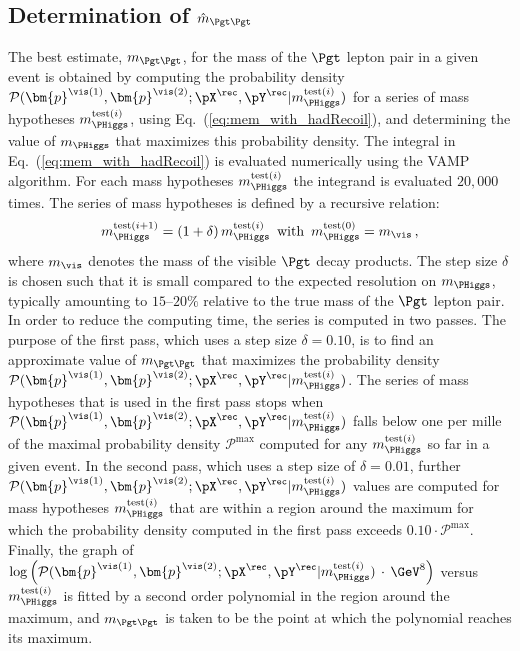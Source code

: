 \subsection{Determination of $\hat{m}_{\Pgt\Pgt}$}
\label{sec:mem_numericalMaximization}

The best estimate, $m_{\Pgt\Pgt}$, for the mass of the $\Pgt$ lepton pair in a given event
is obtained by computing the probability density $\mathcal{P}(\bm{p}^{\vis(1)},\bm{p}^{\vis(2)};\pX^{\rec},\pY^{\rec}|m_{\PHiggs}^{\textrm{test}(i)})$ 
for a series of mass hypotheses $m_{\PHiggs}^{\textrm{test}(i)}$, using Eq.~(\ref{eq:mem_with_hadRecoil}), and determining the value of $m_{\PHiggs}$ that maximizes this probability density.
The integral in Eq.~(\ref{eq:mem_with_hadRecoil}) is evaluated numerically using the VAMP algorithm.
For each mass hypotheses $m_{\PHiggs}^{\textrm{test}(i)}$ the integrand is evaluated $20,000$ times.
The series of mass hypotheses is defined by a recursive relation: 
\begin{equation}
m_{\PHiggs}^{\textrm{test}(i + 1)} = (1 + \delta) \,  m_{\PHiggs}^{\textrm{test}(i)} \, \mbox{ with } \, m_{\PHiggs}^{\textrm{test}(0)} = m_{\vis} \, ,
\label{eq:mTauTau_step_size}
\end{equation}
where $m_{\vis}$ denotes the mass of the visible $\Pgt$ decay products.
The step size $\delta$ is chosen such that it is small compared to the
expected resolution on $m_{\PHiggs}$,
typically amounting to $15$--$20\%$ relative to the true mass of the $\Pgt$ lepton pair.
In order to reduce the computing time, the series is computed in two passes.
The purpose of the first pass, which uses a step size $\delta = 0.10$, is to find an approximate value of $m_{\Pgt\Pgt}$
that maximizes the probability density $\mathcal{P}(\bm{p}^{\vis(1)},\bm{p}^{\vis(2)};\pX^{\rec},\pY^{\rec}|m_{\PHiggs}^{\textrm{test}(i)})$.
The series of mass hypotheses that is used in the first pass stops when $\mathcal{P}(\bm{p}^{\vis(1)},\bm{p}^{\vis(2)};\pX^{\rec},\pY^{\rec}|m_{\PHiggs}^{\textrm{test}(i)})$ falls below one per mille 
of the maximal probability density $\mathcal{P}^{\textrm{max}}$
computed for any $m_{\PHiggs}^{\textrm{test}(i)}$ so far in a given event.
In the second pass, which uses a step size of $\delta = 0.01$,
further $\mathcal{P}(\bm{p}^{\vis(1)},\bm{p}^{\vis(2)};\pX^{\rec},\pY^{\rec}|m_{\PHiggs}^{\textrm{test}(i)})$ values 
are computed for mass hypotheses $m_{\PHiggs}^{\textrm{test}(i)}$ that
are within a region around the maximum
for which the probability density computed in the first pass exceeds
$0.10 \cdot \mathcal{P}^{\textrm{max}}$.
Finally, the graph of $\log \left( \mathcal{P}(\bm{p}^{\vis(1)},\bm{p}^{\vis(2)};\pX^{\rec},\pY^{\rec}|m_{\PHiggs}^{\textrm{test}(i)}) \, \cdot \, \mbox{\GeV}^{8} \right)$ 
versus $m_{\PHiggs}^{\textrm{test}(i)}$ is fitted by a second order polynomial
in the region around the maximum,
and $m_{\Pgt\Pgt}$ is taken to be the point at which the polynomial reaches its maximum.
